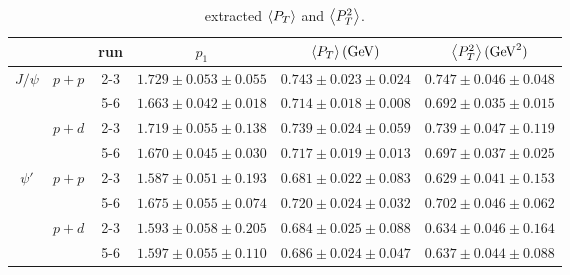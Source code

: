\documentclass[../main.tex]{subfiles}
\begin{document}
\begin{table}[h!]
	\centering
	\caption{extracted $\expval{P_T}$ and $\expval{P^2_T}$.}
	\label{tab:kaplan_result}
	\begin{tabular}{cc|c|c|c|c}
		\hline
		                                               &                        & run & $p_1$                   & $\expval{P_T} (\unit{\GeV})$ & $\expval{P^2_T} (\unit{\square\GeV})$ \\ \hline
		\multicolumn{1}{c|}{\multirow{4}{*}{$J/\psi$}} & \multirow{2}{*}{$p+p$} & 2-3 & $1.729\pm0.053\pm0.055$ & $0.743\pm0.023\pm0.024$      & $0.747\pm0.046\pm0.048$               \\ \cline{3-6}
		\multicolumn{1}{c|}{}                          &                        & 5-6 & $1.663\pm0.042\pm0.018$ & $0.714\pm0.018\pm0.008$      & $0.692\pm0.035\pm0.015$               \\ \cline{2-6}
		\multicolumn{1}{c|}{}                          & \multirow{2}{*}{$p+d$} & 2-3 & $1.719\pm0.055\pm0.138$ & $0.739\pm0.024\pm0.059$      & $0.739\pm0.047\pm0.119$               \\ \cline{3-6}
		\multicolumn{1}{c|}{}                          &                        & 5-6 & $1.670\pm0.045\pm0.030$ & $0.717\pm0.019\pm0.013$      & $0.697\pm0.037\pm0.025$               \\ \hline
		\multicolumn{1}{c|}{\multirow{4}{*}{$\psi'$}}  & \multirow{2}{*}{$p+p$} & 2-3 & $1.587\pm0.051\pm0.193$ & $0.681\pm0.022\pm0.083$      & $0.629\pm0.041\pm0.153$               \\ \cline{3-6}
		\multicolumn{1}{c|}{}                          &                        & 5-6 & $1.675\pm0.055\pm0.074$ & $0.720\pm0.024\pm0.032$      & $0.702\pm0.046\pm0.062$               \\ \cline{2-6}
		\multicolumn{1}{c|}{}                          & \multirow{2}{*}{$p+d$} & 2-3 & $1.593\pm0.058\pm0.205$ & $0.684\pm0.025\pm0.088$      & $0.634\pm0.046\pm0.164$               \\ \cline{3-6}
		\multicolumn{1}{c|}{}                          &                        & 5-6 & $1.597\pm0.055\pm0.110$ & $0.686\pm0.024\pm0.047$      & $0.637\pm0.044\pm0.088$               \\ \hline
	\end{tabular}
\end{table}
\end{document}
